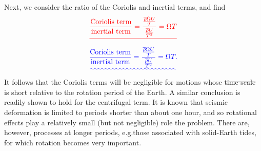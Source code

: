 \documentclass[a4paper,12pt]{paper}
\providecommand{\DIFadd}[1]{{\protect\color{blue}\uwave{#1}}} %
\providecommand{\DIFdel}[1]{{\protect\color{red}\sout{#1}}}                      %
\providecommand{\DIFaddbegin}{} %
\providecommand{\DIFaddend}{} %
\providecommand{\DIFdelbegin}{} %
\providecommand{\DIFdelend}{} %
\begin{document}
Next, we consider the ratio of the Coriolis and inertial terms, and find
\DIFdelbegin \begin{displaymath}
\DIFdel{\frac{\text{Coriolis term}}{\text{inertial term}}=\frac{\frac{\overline{\rho}\Omega U}{T}}{\frac{\overline{\rho}U}{T^{2}}}=\Omega T
}\end{displaymath}%
\DIFdelend \DIFaddbegin \begin{equation}
\DIFadd{\frac{\text{Coriolis term}}{\text{inertial term}}=\frac{\frac{\overline{\rho}\Omega U}{T}}{\frac{\overline{\rho}U}{T^{2}}}=\Omega T.
\label{eq:56}
}\end{equation}\DIFaddend 
It follows that the Coriolis terms will be negligible for motions whose \DIFdelbegin \DIFdel{time-scale }\DIFdelend \DIFaddbegin \DIFadd{time scale }\DIFaddend is short relative to the rotation period 
of the Earth. A similar conclusion is readily shown to hold for the centrifugal term. It is known that seismic deformation 
is limited to periods shorter than about one hour, and so rotational effects play a relatively small (but not negligible) 
role \DIFaddbegin \DIFadd{in }\DIFaddend the problem. There are, however, processes at longer periods, e.g.\DIFaddbegin \DIFadd{\ }\DIFaddend those associated with solid-Earth tides, for which 
rotation becomes very important.
\end{document}
